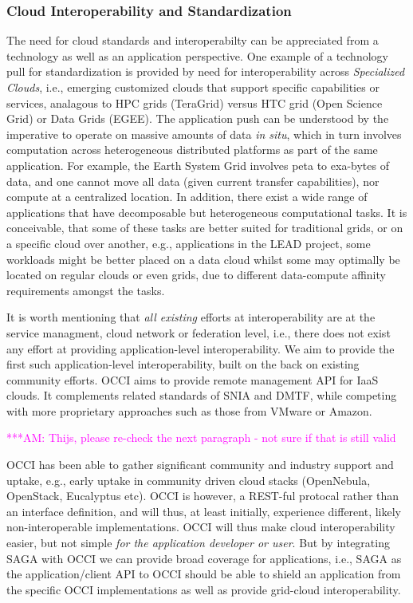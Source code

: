 \documentclass[10pt,conference,final,letterpaper,twoside,twocolumn,]{IEEEtran}
\newcommand{\amnote}[1]{  {\textcolor{magenta} {***AM: #1}}}
\newcommand{\amnote}[1]{}
\begin{document}
 \subsubsection*{Cloud Interoperability and Standardization}

 The need for cloud
standards and interoperabilty can be appreciated from a technology as
well as an application perspective. One example of a technology pull
for standardization is provided by need for interoperability across
{\it Specialized Clouds}, i.e., emerging customized clouds that
support specific capabilities or services, analagous to HPC grids
(TeraGrid) versus HTC grid (Open Science Grid) or Data Grids (EGEE).
The application push can be understood by the imperative to operate on
massive amounts of data {\it in situ}, which in turn involves
computation across heterogeneous distributed platforms as part of the
same application.  For example, the Earth System Grid involves peta to
exa-bytes of data, and one cannot move all data (given current
transfer capabilities), nor compute at a centralized location.  In
addition, there exist a wide range of applications that have
decomposable but heterogeneous computational tasks. It is conceivable,
that some of these tasks are better suited for traditional grids, or
on a specific cloud over another, e.g., applications in the LEAD
project, some workloads might be better placed on a data cloud whilst
some may optimally be located on regular clouds or even grids, due to
different data-compute affinity requirements amongst the tasks.

It is worth mentioning that {\it all existing} efforts at
interoperability are at the service managment, cloud network or
federation level, i.e., there does not exist any effort at providing
application-level interoperability. We aim to provide the first such
application-level interoperability, built on the back on existing
community efforts.  OCCI aims to provide remote management API for
IaaS clouds. It complements related standards of SNIA and DMTF, while
competing with more proprietary approaches such as those from VMware
or Amazon.  

\amnote{Thijs, please re-check the next paragraph - not sure if that
is still valid}

OCCI has been able to gather significant community and industry
support and uptake, e.g., early uptake in community driven cloud
stacks (OpenNebula, OpenStack, Eucalyptus etc).  OCCI is however, a
REST-ful protocal rather than an interface definition, and will thus,
at least initially, experience different, likely non-interoperable
implementations.  OCCI will thus make cloud interoperability easier,
but not simple {\it for the application developer or user}.  But by
integrating SAGA with OCCI we can provide broad coverage for
applications, i.e., SAGA as the application/client API to OCCI should
be able to shield an application from the specific OCCI
implementations as well as provide grid-cloud interoperability.
\end{document}
